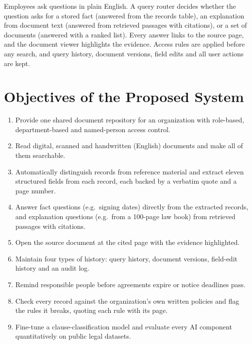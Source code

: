 Employees ask questions in plain English. A query router decides whether the question asks for a
stored fact (answered from the records table), an explanation from document text (answered from
retrieved passages with citations), or a set of documents (answered with a ranked list). Every answer
links to the source page, and the document viewer highlights the evidence. Access rules are applied
before any search, and query history, document versions, field edits and all user actions are kept.

\section{Objectives of the Proposed System}
\begin{enumerate}
\item Provide one shared document repository for an organization with role-based, department-based and
named-person access control.
\item Read digital, scanned and handwritten (English) documents and make all of them searchable.
\item Automatically distinguish records from reference material and extract eleven structured fields
from each record, each backed by a verbatim quote and a page number.
\item Answer fact questions (e.g.\ signing dates) directly from the extracted records, and explanation
questions (e.g.\ from a 100-page law book) from retrieved passages with citations.
\item Open the source document at the cited page with the evidence highlighted.
\item Maintain four types of history: query history, document versions, field-edit history and an
audit log.
\item Remind responsible people before agreements expire or notice deadlines pass.
\item Check every record against the organization's own written policies and flag the rules it breaks,
quoting each rule with its page.
\item Fine-tune a clause-classification model and evaluate every AI component quantitatively on public
legal datasets.
\end{enumerate}

